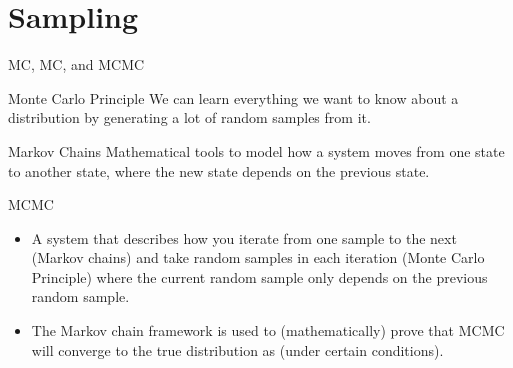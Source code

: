 \documentclass[10pt,handout]{beamer}
\begin{document}
\section{Sampling}%
\label{sec:sampling}




\begin{frame}[t]{MC, MC, and MCMC}

  \begin{block}{Monte Carlo Principle}
   We can learn everything we want to know about a distribution by generating a lot of random samples from it.
  \end{block}

  \begin{block}{Markov Chains}
    Mathematical tools to model how a system moves from one state to another state, where the new state depends on the previous state.
  \end{block}

  \begin{block}{MCMC}
    \begin{itemize}
      \item A system that describes how you iterate from one sample to the next (Markov chains) and take random samples in each iteration (Monte Carlo Principle) where the current random sample only depends on the previous random sample.
      \item The Markov chain framework is used to (mathematically) prove that MCMC will converge to the true distribution as  (under certain conditions).
    \end{itemize}
  \end{block}


\end{frame}
\end{document}
